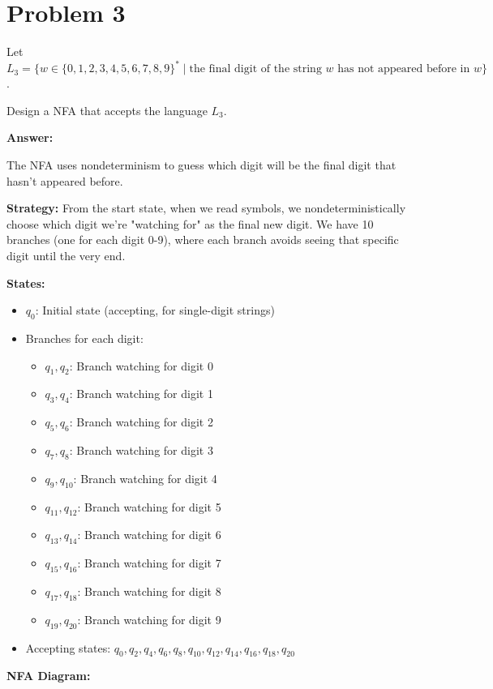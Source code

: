 \documentclass[12pt]{article}
\begin{document}
\newpage

\section*{Problem 3}
Let $L_3 = \{w \in \{0, 1, 2, 3, 4, 5, 6, 7, 8, 9\}^* \mid \text{the final digit of the string } w \text{ has not appeared before in } w\}$.

Design a NFA that accepts the language $L_3$.

\textbf{Answer:}

The NFA uses nondeterminism to guess which digit will be the final digit that hasn't appeared before.

\textbf{Strategy:}
From the start state, when we read symbols, we nondeterministically choose which digit we're "watching for" as the final new digit. We have 10 branches (one for each digit 0-9), where each branch avoids seeing that specific digit until the very end.

\textbf{States:}
\begin{itemize}
    \item $q_0$: Initial state (accepting, for single-digit strings)
    \item Branches for each digit:
    \begin{itemize}
        \item $q_1, q_2$: Branch watching for digit 0
        \item $q_3, q_4$: Branch watching for digit 1
        \item $q_5, q_6$: Branch watching for digit 2
        \item $q_7, q_8$: Branch watching for digit 3
        \item $q_9, q_{10}$: Branch watching for digit 4
        \item $q_{11}, q_{12}$: Branch watching for digit 5
        \item $q_{13}, q_{14}$: Branch watching for digit 6
        \item $q_{15}, q_{16}$: Branch watching for digit 7
        \item $q_{17}, q_{18}$: Branch watching for digit 8
        \item $q_{19}, q_{20}$: Branch watching for digit 9
    \end{itemize}
    \item Accepting states: $q_0, q_2, q_4, q_6, q_8, q_{10}, q_{12}, q_{14}, q_{16}, q_{18}, q_{20}$
\end{itemize}

\textbf{NFA Diagram:}
\end{document}
